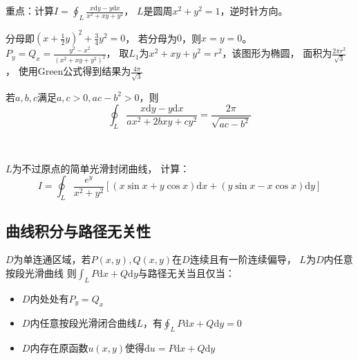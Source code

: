 \begin{exercise}[推广题2]
  重点：计算$I = \oint _L \frac{x\mathrm{d} y - y\mathrm{d} x}{x^2 + xy + y^2}$，
  $L$是圆周$x^2 + y^2 = 1$，逆时针方向。
\end{exercise}

\begin{solution}
  分母即$(x + \frac{1}{2}y)^2 + \frac{3}{4}y^2 = 0$，
  若分母为$0$，则$x = y = 0$。
  $P_y = Q_x = \frac{y^2 - x^2}{(x^2 + xy + y^2)^2}$，
  取$L_1$为$x^2 + xy + y^2= r^2$，该图形为椭圆，
  面积为$\frac{2\pi r^2}{\sqrt{3}}$，
  使用Green公式得到结果为$\frac{4\pi}{\sqrt{3}}$
\end{solution}

\begin{corollary}[常用函数3]
  若$a,b,c$满足$a, c > 0, ac - b^2 > 0$，则
  \begin{equation*}
    \oint _L \frac{x\mathrm{d} y - y\mathrm{d} x}{ax^2 + 2bxy + cy^2} = \frac{2\pi}{\sqrt{ac - b^2}}
  \end{equation*}
\end{corollary}

~

\begin{exercise}[其他形式]
  $L$为不过原点的简单光滑封闭曲线，
  计算：
  \begin{equation*}
    I = \oint_{L }\frac{e^y}{x^2 + y^2} \left[ (x \sin x + y \cos x)\mathrm{d} x + (y \sin x - x \cos x)\mathrm{d} y \right]
  \end{equation*}
\end{exercise}


\subsection{曲线积分与路径无关性}

\begin{theorem}[路径无关性]
  $D$为单连通区域，若$P(x,y),Q(x,y)$在$D$连续且有一阶连续偏导，
  $L$为$D$内任意按段光滑曲线
  则$\int_L P\mathrm{d} x + Q \mathrm{d} y$与路径无关当且仅当：
  \begin{itemize}
  \item $D$内处处有$P_y = Q_x$
  \item $D$内任意按段光滑闭合曲线$L$，有$\oint_L P \mathrm{d} x + Q \mathrm{d} y = 0$
  \item $D$内存在原函数$u(x,y)$使得$\mathrm{d} u = P \mathrm{d} x + Q \mathrm{d} y$
  \end{itemize}
\end{theorem}




